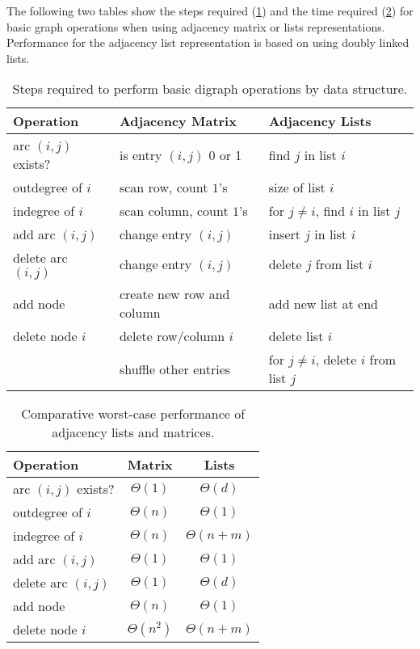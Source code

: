 The following two tables show the steps required (\cref{tbl:basicOpsSteps}) 
and the time required (\cref{tbl:basicOpsPerformance}) for basic graph operations 
when using adjacency matrix or lists representations.  
Performance for the adjacency list representation is based on using doubly linked lists.

\begin{table}[H]\label{tbl:basicOpsSteps}
\centering
\caption{Steps required to perform basic digraph operations by data structure.}
\begin{tabular}{|l|l|l|}
\hline
\textbf{Operation} & \textbf{Adjacency Matrix} & \textbf{Adjacency Lists} \\
\hline
arc $(i, j)$ exists? & is entry $(i,j)$ 0 or 1  & find $j$ in  list $i$ \\
\hline
outdegree  of $i$ & scan row, count $1$'s & size of  list  $i$\\
\hline
indegree of $i$ & scan column,  count $1$'s & for $j\neq i$, find $i$ in list $j$ \\
\hline
add arc $(i, j)$ & change entry $(i ,j)$ & insert $j$ in list $i$ \\
\hline
delete arc $(i, j)$ & change entry $(i ,j)$ & delete $j$ from list $i$ \\
\hline
add node & create new row and column & add new list at end\\
\hline
delete node $i$ & delete row/column $i$  & delete list $i$ \\
& shuffle other entries & for $j\neq i$, delete  $i$ from list $j$ \\
\hline
\end{tabular}
\end{table}

\begin{table}[H]\label{tbl:basicOpsPerformance}
\centering
\caption{Comparative worst-case performance of adjacency lists and matrices.}
\begin{tabular}{|l|c|c|}
\hline
\textbf{Operation} 	& \textbf{Matrix} & \textbf{Lists} \\
\hline
arc $(i, j)$ exists? & $\Theta(1)$  & $\Theta(d)$ \\
\hline
outdegree  of $i$ 	& $\Theta(n)$ & $\Theta(1)$ \\
\hline
indegree of $i$ 	& $\Theta(n)$ &  $\Theta(n+m)$ \\
\hline
add arc $(i, j)$ 	& $\Theta(1)$ & $\Theta(1)$  \\
\hline
delete arc $(i, j)$ & $\Theta(1)$  & $\Theta(d)$  \\
\hline
add node 			& $\Theta(n)$ & $\Theta(1)$  \\
\hline
delete node $i$ 	& $\Theta(n^2)$  & $\Theta(n+m)$  \\
\hline
\end{tabular}
\end{table}

